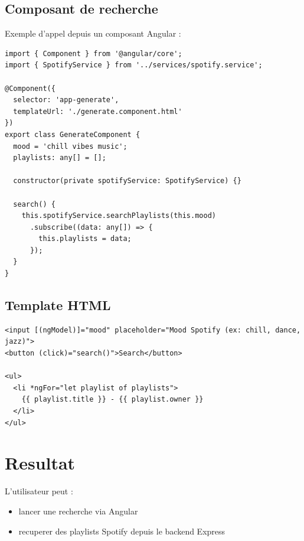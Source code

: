 \documentclass[a4paper,11pt]{article}
\begin{document}
\subsection{Composant de recherche}

Exemple d'appel depuis un composant Angular :

\begin{lstlisting}
import { Component } from '@angular/core';
import { SpotifyService } from '../services/spotify.service';

@Component({
  selector: 'app-generate',
  templateUrl: './generate.component.html'
})
export class GenerateComponent {
  mood = 'chill vibes music';
  playlists: any[] = [];

  constructor(private spotifyService: SpotifyService) {}

  search() {
    this.spotifyService.searchPlaylists(this.mood)
      .subscribe((data: any[]) => {
        this.playlists = data;
      });
  }
}
\end{lstlisting}

\subsection{Template HTML}

\begin{lstlisting}
<input [(ngModel)]="mood" placeholder="Mood Spotify (ex: chill, dance, jazz)">
<button (click)="search()">Search</button>

<ul>
  <li *ngFor="let playlist of playlists">
    {{ playlist.title }} - {{ playlist.owner }}
  </li>
</ul>
\end{lstlisting}

\section{Resultat}

L'utilisateur peut :

\begin{itemize}
\item lancer une recherche via Angular
\item recuperer des playlists Spotify depuis le backend Express
\end{itemize}
\end{document}
